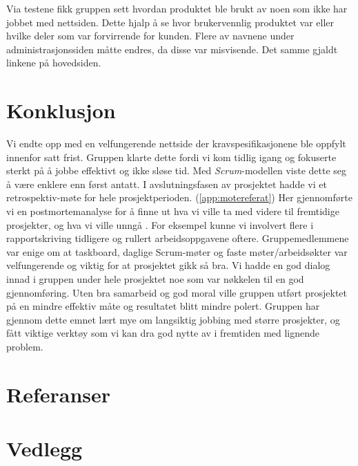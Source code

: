 \documentclass[12pt,a4paper,norsk]{article}
\begin{document}
Via testene fikk gruppen sett hvordan produktet ble brukt av noen som ikke har jobbet med nettsiden. Dette hjalp å se hvor brukervennlig produktet var eller hvilke deler som var forvirrende for kunden. Flere av navnene under administrasjonssiden måtte endres, da disse var misvisende. Det samme gjaldt  linkene på hovedsiden.

\section{Konklusjon}
Vi endte opp med en velfungerende nettside der kravspesifikasjonene ble oppfylt innenfor satt frist. Gruppen klarte dette fordi vi kom tidlig igang og fokuserte sterkt på å jobbe effektivt og ikke sløse tid. Med \textit{Scrum}-modellen viste dette seg å være enklere enn først antatt. I avslutningsfasen av prosjektet hadde vi et retrospektiv-møte for hele prosjektperioden. (\cref{app:motereferat}) Her gjennomførte vi en postmortemanalyse for å finne ut hva vi ville ta med videre til fremtidige prosjekter, og hva vi ville unngå \cite[side 37]{dyba}. For eksempel kunne vi involvert flere i rapportskriving tidligere og rullert arbeidsoppgavene oftere. Gruppemedlemmene var enige om at taskboard, daglige Scrum-møter og faste møter/arbeidsøkter var velfungerende og viktig for at prosjektet gikk så bra. Vi hadde en god dialog innad i gruppen under hele prosjektet noe som var nøkkelen til en god gjennomføring. Uten bra samarbeid og god moral ville gruppen utført prosjektet på en mindre effektiv måte og resultatet blitt mindre polert. Gruppen har gjennom dette emnet lært mye om langsiktig jobbing med større prosjekter, og fått viktige verktøy som vi kan dra god nytte av i fremtiden med lignende problem.


\newpage
{}
\section{Referanser}


\section{Vedlegg}



\end{document}
